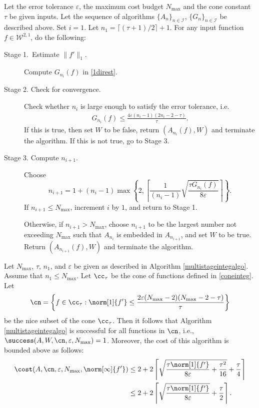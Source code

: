 \begin{algo} \label{multistageintegalgo}
Let the error tolerance $\varepsilon$, the maximum cost budget $N_{\text{max}}$ and the cone constant $\tau$ be given inputs. Let the sequence of algorithms $\{A_n\}_{n\in \mathcal{I}}$, $\{G_n\}_{n\in \mathcal{I}}$ be described above. Set $i=1$. Let $n_1=\lceil(\tau+1)/2\rceil+1$. For any input function $f\in \mathcal{W}^{2,1}$, do the following:
\begin{description}
\item[Stage 1.\ Estimate {$\|f'\|_{1}$}.] Compute $G_{n_i}(f)$ in \eqref{1direst}.

\item[Stage 2. Check for convergence.] Check whether $n_i$ is large enough to satisfy the error tolerance, i.e.
    \begin{align*}
     G_{n_i}(f) \le \frac{4\varepsilon(n_i-1)(2n_i-2 - \tau)}{\tau}.
    \end{align*}
    If this is true, then set $W$ to be false, return $(A_{n_i}(f),W)$ and terminate the algorithm. If this is not true, go to Stage 3.

\item[Stage 3. Compute $n_{i+1}$.] Choose
$$
n_{i+1}=1+ (n_i-1)\max\left\{2,\left\lceil\frac{1}{(n_i-1)}\sqrt{\frac{\tau G_{n_i}(f)}{8\varepsilon}}\right\rceil\right\}.
$$
If $n_{i+1} \le N_{\max}$, increment $i$ by $1$, and return to Stage 1.

Otherwise, if $n_{i+1} > N_{\max}$, choose $n_{i+1}$ to be the largest number not exceeding $N_{\max}$ such that $A_{n_{i}}$ is embedded in $A_{n_{i+1}}$, and set $W$ to be true. Return $(A_{n_{i+1}}(f),W)$ and terminate the algorithm.
\end{description}
\end{algo}

\begin{theorem} \label{multistageintegthm} Let  $N_{\max}$, $\tau$, $n_1$, and $\varepsilon$ be given as described in Algorithm \ref{multistageintegalgo}.  Assume that $n_1 \le N_{\max}$.  Let $\cc_\tau$ be the cone of functions defined in \eqref{coneinteg}.  Let
$$
\cn
= \left \{ f \in \cc_\tau : \norm[1]{f'} \le \frac{2\varepsilon (N_{\max}-2)(N_{\max}-2 -\tau)}{\tau} \right\}
$$
be the nice subset of the cone $\cc_\tau$.  Then it follows that Algorithm \ref{multistageintegalgo} is successful for all functions in $\cn$,  i.e.,  $\success(A,W,\cn,\varepsilon,N_{\max}) = 1$.  Moreover, the cost of this algorithm is bounded above as follows:
\begin{align*}
\cost(A,\cn,\varepsilon,N_{\max},\norm[\infty]{f'})
&\le 2+2 \left \lceil \sqrt{\frac{\tau \norm[1]{f'}}{8\varepsilon} + \frac{\tau^2 }{16}} + \frac{\tau}{4} \right\rceil \\
&\le 2+2 \left \lceil\sqrt{\frac{\tau \norm[1]{f'}}{8\varepsilon}} + \frac{\tau}{2} \right \rceil.
\end{align*}
\end{theorem}

